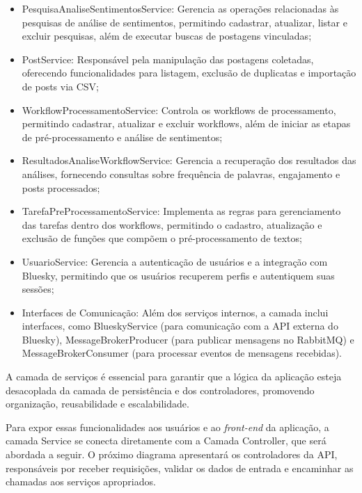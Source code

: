 \documentclass[
	12pt,				%
	oneside,			%
	a4paper,			%
	english,			%
	french,				%
	spanish,			%
	brazil				%
	]{abntex2}
\begin{document}
\begin{itemize}
\tightlist
\item
  PesquisaAnaliseSentimentosService: Gerencia as operações relacionadas
  às pesquisas de análise de sentimentos, permitindo cadastrar,
  atualizar, listar e excluir pesquisas, além de executar buscas de
  postagens vinculadas;
\item
  PostService: Responsável pela manipulação das postagens coletadas,
  oferecendo funcionalidades para listagem, exclusão de duplicatas e
  importação de posts via CSV;
\item
  WorkflowProcessamentoService: Controla os workflows de processamento,
  permitindo cadastrar, atualizar e excluir workflows, além de iniciar
  as etapas de pré-processamento e análise de sentimentos;
\item
  ResultadosAnaliseWorkflowService: Gerencia a recuperação dos
  resultados das análises, fornecendo consultas sobre frequência de
  palavras, engajamento e posts processados;
\item
  TarefaPreProcessamentoService: Implementa as regras para gerenciamento
  das tarefas dentro dos workflows, permitindo o cadastro, atualização e
  exclusão de funções que compõem o pré-processamento de textos;
\item
  UsuarioService: Gerencia a autenticação de usuários e a integração com
  Bluesky, permitindo que os usuários recuperem perfis e autentiquem
  suas sessões;
\item
  Interfaces de Comunicação: Além dos serviços internos, a camada inclui
  interfaces, como BlueskyService (para comunicação com a API externa do
  Bluesky), MessageBrokerProducer (para publicar mensagens no RabbitMQ)
  e MessageBrokerConsumer (para processar eventos de mensagens
  recebidas).
\end{itemize}

A camada de serviços é essencial para garantir que a lógica da aplicação
esteja desacoplada da camada de persistência e dos controladores,
promovendo organização, reusabilidade e escalabilidade.

Para expor essas funcionalidades aos usuários e ao \emph{front-end} da
aplicação, a camada Service se conecta diretamente com a Camada
Controller, que será abordada a seguir. O próximo diagrama apresentará
os controladores da API, responsáveis por receber requisições, validar
os dados de entrada e encaminhar as chamadas aos serviços apropriados.
\end{document}
